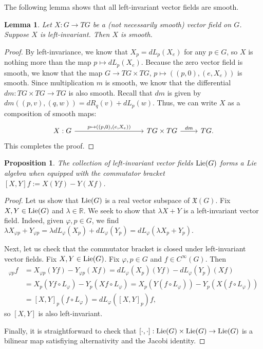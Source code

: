 \documentclass{amsart}
\newcommand{\R}{\mathbb R}
\newcommand{\lie}{\text{\normalfont Lie}}
\theoremstyle{plain}
\newtheorem{proposition}[theorem]{Proposition}
\newtheorem{lemma}[theorem]{Lemma}
\theoremstyle{definition}
\theoremstyle{remark}
\begin{document}
	The following lemma shows that all left-invariant vector fields are smooth.
	\begin{lemma}
		\label{smoothness of left}
		Let $X:G \rightarrow TG$ be a (not necessarily smooth) vector field on $G$. Suppose $X$ is left-invariant. Then $X$ is smooth.
	\end{lemma}
	\begin{proof}
		By left-invariance, we know that $X_p = dL_p(X_e)$ for any $p \in G$, so $X$ is nothing more than the map $p \mapsto dL_p(X_e)$. Because the zero vector field is smooth, we know that the map $G \rightarrow TG \times TG$, $p \mapsto ((p,0), (e,X_e))$ is smooth.  Since multiplication $m$ is smooth, we know that the differential $dm:TG \times TG \rightarrow TG$ is also smooth. Recall that $dm$ is given by 
		$dm((p,v),(q,w)) = dR_q(v) + dL_p(w).$
		Thus, we can write $X$ as a composition of smooth maps:
		$$\begin{tikzcd}
			X:G \arrow{rrrr}{p \mapsto ((p,0), (e,X_e))} &&&& TG \times TG \arrow{r}{dm}& TG.
		\end{tikzcd}$$
		This completes the proof.
	\end{proof}
	\begin{proposition}
		The collection of left-invariant vector fields $\lie(G)$ forms a Lie algebra when equipped with the commutator bracket $[X,Y]f := X(Yf) - Y(Xf)$. 
	\end{proposition}
	\begin{proof}
		Let us show that $\lie(G)$ is a real vector subspace of $\mathfrak X(G)$.  Fix $X,Y \in \lie(G)$ and $\lambda \in \R$. We seek to show that $\lambda X + Y$ is a left-invariant vector field. Indeed, given $\varphi, p \in G$, we find $\lambda X_{\varphi p} + Y_{\varphi p} = \lambda dL_\varphi (X_p) + dL_\varphi(Y_p) = dL_{\varphi}(\lambda X_p + Y_p).$
		
		Next, let us check that the commutator bracket is closed under left-invariant vector fields. Fix $X,Y \in \lie(G)$. Fix $\varphi,p \in G$ and $f \in C^\infty(G)$. Then 
		\begin{align*}
			[X,Y]_{\varphi p}f &= X_{\varphi p}(Yf) - Y_{\varphi p}(Xf) = dL_\varphi(X_p)(Yf) - dL_\varphi(Y_p) (Xf) \\
			&= X_p (Yf \circ L_\varphi) - Y_p (Xf \circ L_\varphi) = X_p(Y(f \circ L_\varphi)) - Y_p (X(f \circ L_\varphi)) \\
	 		&= [X,Y]_p (f \circ L_\varphi) = dL_{\varphi}([X,Y]_p)f,
		\end{align*}
		so $[X,Y]$ is also left-invariant.
		
		Finally, it is straightforward to check that $[\cdot,\cdot]:\lie(G) \times \lie(G) \rightarrow \lie(G)$ is a bilinear map satisfiying alternativity and the Jacobi identity. 
	\end{proof}
	
\end{document}
